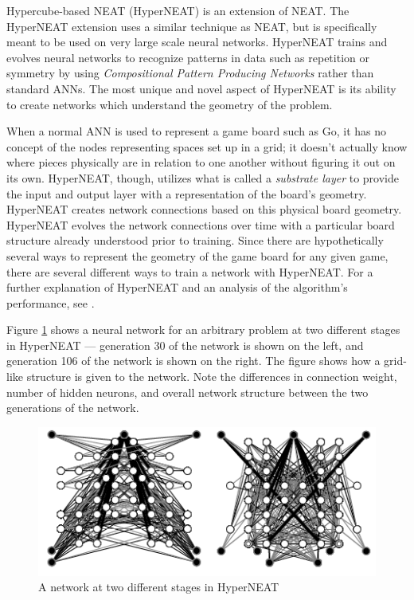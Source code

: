 Hypercube-based NEAT (HyperNEAT) is an extension of NEAT.  The HyperNEAT extension uses a similar technique as NEAT, but is specifically meant to be used on very large scale neural networks.  HyperNEAT trains and evolves neural networks to recognize patterns in data such as repetition or symmetry by using \textit{Compositional Pattern Producing Networks} rather than standard ANNs.  The most unique and novel aspect of HyperNEAT is its ability to create networks which understand the geometry of the problem. \cite{HyperNEAT}

When a normal ANN is used to represent a game board such as Go, it has no concept of the nodes representing spaces set up in a grid; it doesn't actually know where pieces physically are in relation to one another without figuring it out on its own.  HyperNEAT, though, utilizes what is called a \textit{substrate layer} to provide the input and output layer with a representation of the board's geometry.  HyperNEAT creates network connections based on this physical board geometry.  HyperNEAT evolves the network connections over time with a particular board structure already understood prior to training.  Since there are hypothetically several ways to represent the geometry of the game board for any given game, there are several different ways to train a network with HyperNEAT.  For a further explanation of HyperNEAT and an analysis of the algorithm's performance, see \cite{HyperNEAT}.

Figure \ref{fig:neatnet} shows a neural network for an arbitrary problem at two different stages in HyperNEAT --- generation 30 of the network is shown on the left, and generation 106 of the network is shown on the right.  The figure shows how a grid-like structure is given to the network.  Note the differences in connection weight, number of hidden neurons, and overall network structure between the two generations of the network.

\begin{figure}[h]
\centering
\includegraphics[scale=0.55]{images/hyperneatnets.png}
\caption{A network at two different stages in HyperNEAT \cite{hyperpic}}
\label{fig:neatnet}
\end{figure}

